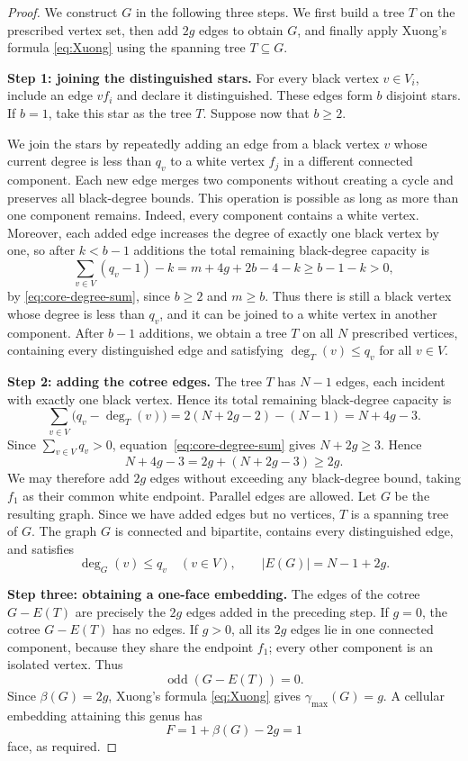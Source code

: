 \documentclass[11pt]{amsart}
\theoremstyle{definition}
\theoremstyle{plain}
\theoremstyle{definition}
\theoremstyle{definition}
\begin{document}
\begin{proof}
We construct $G$ in the following three steps.  We first build a
tree $T$ on the prescribed vertex set, then add $2g$ edges to obtain
$G$, and finally apply Xuong's formula \eqref{eq:Xuong} using
the spanning tree $T\subseteq G$.

\textbf{Step 1: joining the distinguished stars.}
For every black vertex $v\in V_i$, include an edge $vf_i$ and declare it
distinguished.  These edges form $b$ disjoint stars.
If $b=1$, take this star as the tree $T$.
Suppose now that $b\geq2$.

We join the stars by repeatedly adding an edge from a black vertex
$v$ whose current degree is less than $q_v$ to a white vertex $f_j$
in a different connected component.  Each new edge merges two
components without creating a cycle and preserves all black-degree
bounds.
This operation is possible as long as more than one component
remains.  Indeed, every component contains a white vertex.
Moreover, each added edge increases the degree of exactly one
black vertex by one, so after $k<b-1$ additions the total remaining
black-degree capacity is
\[
  \sum_{v\in V}(q_v-1)-k
  =m+4g+2b-4-k
  \geq b-1-k>0,
\]
by \eqref{eq:core-degree-sum}, since $b\geq2$ and $m\geq b$.
Thus there is still a black vertex whose degree is less than $q_v$,
and it can be joined to a white vertex in another component.
After $b-1$ additions, we obtain a tree $T$ on all $N$ prescribed
vertices, containing every distinguished edge and satisfying
$\deg_T(v)\leq q_v$ for all $v\in V$.

\textbf{Step 2: adding the cotree edges.}
The tree $T$ has $N-1$ edges, each incident with exactly one black
vertex.  Hence its total remaining black-degree capacity is
\begin{equation}
\label{eq:residual-capacity}
  \sum_{v\in V}\bigl(q_v-\deg_T(v)\bigr)
  =2(N+2g-2)-(N-1)
  =N+4g-3.
\end{equation}
Since $\sum_{v\in V}q_v>0$, equation~\eqref{eq:core-degree-sum}
gives $N+2g\geq3$. Hence
\[
  N+4g-3=2g+(N+2g-3)\geq2g.
\]
We may therefore add $2g$ edges without exceeding any
black-degree bound, taking $f_1$ as their common white
endpoint. Parallel edges are allowed.
Let $G$ be the resulting graph.  Since we have added edges but
no vertices, $T$ is a spanning tree of $G$.  The graph $G$ is
connected and bipartite, contains every distinguished edge,
and satisfies
\[
  \deg_G(v)\leq q_v \quad(v\in V),
  \qquad
  |E(G)|=N-1+2g.
\]

\textbf{Step three: obtaining a one-face embedding.}
The edges of the cotree $G-E(T)$ are precisely the $2g$ edges
added in the preceding step.
If $g=0$, the cotree $G-E(T)$ has no edges.
If $g>0$, all its $2g$ edges lie in one connected component,
because they share the endpoint $f_1$; every other component
is an isolated vertex.  Thus
\[
  \operatorname{odd}(G-E(T))=0.
\]
Since $\beta(G)=2g$, Xuong's formula \eqref{eq:Xuong} gives
$\gamma_{\max}(G)=g$.  A cellular embedding attaining this genus
has
\[
  F=1+\beta(G)-2g=1
\]
face, as required.
\end{proof}
\end{document}
